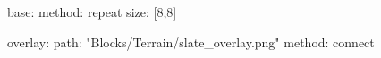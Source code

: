 base:
  method: repeat
  size: [8,8]

overlay:
  path: "Blocks/Terrain/slate_overlay.png"
  method: connect